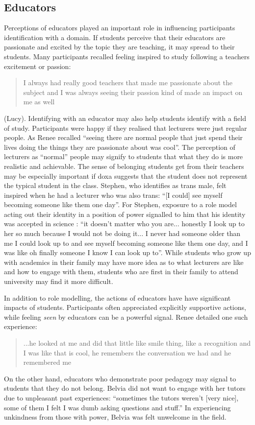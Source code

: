 \subsection{Educators}
Perceptions of educators played an important role in influencing participants identification with a domain. If students perceive that their educators are passionate and excited by the topic they are teaching, it may spread to their students. Many participants recalled feeling inspired to study following a teachers excitement or passion: \blockquote{I always had really good teachers that made me passionate about the subject and I was always seeing their passion kind of made an impact on me as well} (Lucy). Identifying with an educator may also help students identify with a field of study.  Participants were happy if they realised that lecturers were just regular people. As Renee recalled ``seeing there are normal people that just spend their lives doing the things they are passionate about was cool''. The perception of lecturers as ``normal'' people may signify to students that what they do is more realistic and achievable. The sense of belonging students get from their teachers may be especially important if doxa suggests that the student does not represent the typical student in the class. Stephen, who identifies as trans male, felt inspired when he had a lecturer who was also trans: ``[I could] see myself becoming someone like them one day''. For Stephen, exposure to a role model acting out their identity in a position of power signalled to him that his identity was accepted in science : ``it doesn't matter who you are... honestly I look up to her so much because I would not be doing it... I never had someone older than me I could look up to and see myself becoming someone like them one day, and I was like oh finally someone I know I can look up to''. While students who grow up with academics in their family may have more idea as to what lecturers are like and how to engage with them, students who are first in their family to attend university may find it more difficult.

In addition to role modelling, the actions of educators have have significant impacts of students. Participants often appreciated explicitly supportive actions, while feeling \textit{seen} by educators can be a powerful signal. Renee detailed one such experience: \blockquote{...he looked at me and did that little like smile thing, like a recognition and I was like that is cool, he remembers the conversation we had and he remembered me} On the other hand, educators who demonstrate poor pedagogy may signal to students that they do not belong. Belvia did not want to engage with her tutors due to unpleasant past experiences: ``sometimes the tutors weren't [very nice], some of them I felt I was dumb asking questions and stuff.'' In experiencing unkindness from those with power, Belvia was felt unwelcome in the field.  



